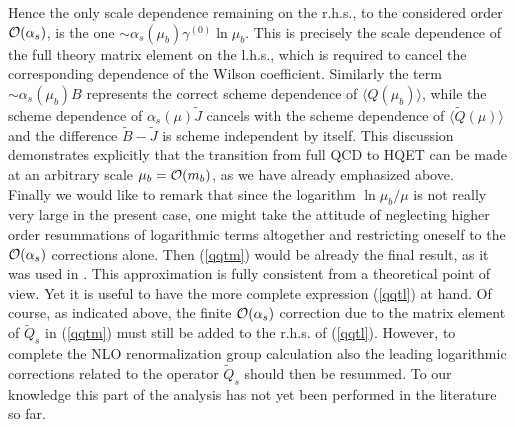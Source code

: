 Hence the only scale dependence remaining on the r.h.s., to the
considered order ${\cal O}(\alpha_s)$, is the one
$\sim\alpha_s(\mu_b)\gamma^{(0)}\ln\mu_b$. This is precisely the scale
dependence of the full theory matrix element on the l.h.s., which is
required to cancel the corresponding dependence of the Wilson
coefficient. Similarly the term $\sim\alpha_s(\mu_b)B$ represents the
correct scheme dependence of $\langle Q(\mu_b)\rangle$, while the
scheme dependence of $\alpha_s(\mu)\tilde J$ cancels with the scheme
dependence of $\langle\tilde Q(\mu)\rangle$ and the difference $\tilde
B-\tilde J$ is scheme independent by itself.  This discussion
demonstrates explicitly that the transition from full QCD to HQET can
be made at an arbitrary scale $\mu_b={\cal O}(m_b)$, as we have already
emphasized above.
\\
Finally we would like to remark that since the logarithm $\ln\mu_b/\mu$
is not really very large in the present case, one might take the
attitude of neglecting higher order resummations of logarithmic terms
altogether and restricting oneself to the ${\cal O}(\alpha_s)$
corrections alone. Then (\ref{qqtm}) would be already the final result,
as it was used in \cite{flynnetal:91}. This approximation is fully
consistent from a theoretical point of view. Yet it is useful to have
the more complete expression (\ref{qqtl}) at hand. Of course, as
indicated above, the finite ${\cal O}(\alpha_s)$ correction due to the
matrix element of $\tilde Q_s$ in (\ref{qqtm}) must still be added to
the r.h.s. of (\ref{qqtl}).  However, to complete the NLO
renormalization group calculation also the leading logarithmic
corrections related to the operator $\tilde Q_s$ should then be
resummed. To our knowledge this part of the analysis has not yet been
performed in the literature so far.
